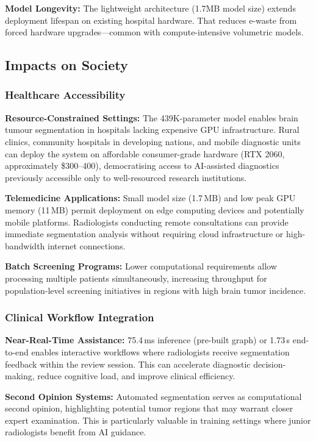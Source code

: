 \documentclass{article}
\begin{document}
\textbf{Model Longevity:} The lightweight architecture (1.7MB model size) extends deployment lifespan on existing hospital hardware. That reduces e-waste from forced hardware upgrades—common with compute-intensive volumetric models.


\subsection{Impacts on Society}

\subsubsection{Healthcare Accessibility}

\textbf{Resource-Constrained Settings:} The 439K-parameter model enables brain tumour segmentation in hospitals lacking expensive GPU infrastructure. Rural clinics, community hospitals in developing nations, and mobile diagnostic units can deploy the system on affordable consumer-grade hardware (RTX 2060, approximately \$300--400), democratising access to AI-assisted diagnostics previously accessible only to well-resourced research institutions.

\textbf{Telemedicine Applications:} Small model size (1.7\,MB) and low peak GPU memory (11\,MB) permit deployment on edge computing devices and potentially mobile platforms. Radiologists conducting remote consultations can provide immediate segmentation analysis without requiring cloud infrastructure or high-bandwidth internet connections.

\textbf{Batch Screening Programs:} Lower computational requirements allow processing multiple patients simultaneously, increasing throughput for population-level screening initiatives in regions with high brain tumor incidence.

\subsubsection{Clinical Workflow Integration}

\textbf{Near-Real-Time Assistance:} 75.4\,ms inference (pre-built graph) or 1.73\,s end-to-end enables interactive workflows where radiologists receive segmentation feedback within the review session. This can accelerate diagnostic decision-making, reduce cognitive load, and improve clinical efficiency.

\textbf{Second Opinion Systems:} Automated segmentation serves as computational second opinion, highlighting potential tumor regions that may warrant closer expert examination. This is particularly valuable in training settings where junior radiologists benefit from AI guidance.
\end{document}
